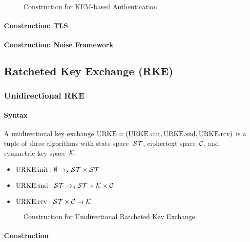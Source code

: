 \documentclass[a4paper,orivec]{llncs}
\begin{document}
\begin{figure}[!ht]
     \centering
     \fbox{\scalebox{\codescalefactor}{}}
     \caption{Construction for KEM-based Authentication.}
     \label{fig:kem_based_auth}
\end{figure}

\paragraph{Construction: TLS}

\paragraph{Construction: Noise Framework}


\subsection{Ratcheted Key Exchange (RKE)}

\subsubsection{Unidirectional RKE}

\paragraph{Syntax}
A unidirectional key exchange $\mathrm{URKE}=(\mathrm{URKE}.\mathrm{init},\mathrm{URKE}.\mathrm{snd},\mathrm{URKE}.\mathrm{rcv})$ is a tuple of three algorithms with state space~$\mathcal{ST}$, ciphertext space~$\mathcal{C}$, and symmetric key space~$\mathcal{K}$:

\begin{itemize}
    \item $\mathrm{URKE}.\mathrm{init}: \emptyset \to_\$ \mathcal{ST}\times\mathcal{ST}$
    \item $\mathrm{URKE}.\mathrm{snd}: \mathcal{ST} \to_\$ \mathcal{ST}\times\mathcal{K}\times\mathcal{C}$
    \item $\mathrm{URKE}.\mathrm{rcv}: \mathcal{ST}\times\mathcal{C} \to \mathcal{K}$
\end{itemize}

\begin{figure}[!ht]
    \centering
    \fbox{\scalebox{\codescalefactor}{}}
    \caption{Construction for Unidirectional Ratcheted Key Exchange}
    \label{fig:rke:unidirectional}
\end{figure}

\paragraph{Construction}
\end{document}
